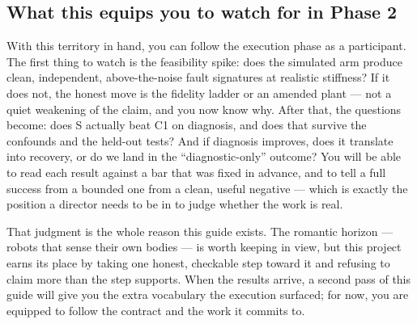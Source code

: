 \documentclass[12pt]{article}
\begin{document}
\subsection{What this equips you to watch for in Phase 2}

With this territory in hand, you can follow the execution phase as a participant. The first thing to watch is the feasibility spike: does the simulated arm produce clean, independent, above-the-noise fault signatures at realistic stiffness? If it does not, the honest move is the fidelity ladder or an amended plant --- not a quiet weakening of the claim, and you now know why. After that, the questions become: does S actually beat C1 on diagnosis, and does that survive the confounds and the held-out tests? And if diagnosis improves, does it translate into recovery, or do we land in the ``diagnostic-only'' outcome? You will be able to read each result against a bar that was fixed in advance, and to tell a full success from a bounded one from a clean, useful negative --- which is exactly the position a director needs to be in to judge whether the work is real.

That judgment is the whole reason this guide exists. The romantic horizon --- robots that sense their own bodies --- is worth keeping in view, but this project earns its place by taking one honest, checkable step toward it and refusing to claim more than the step supports. When the results arrive, a second pass of this guide will give you the extra vocabulary the execution surfaced; for now, you are equipped to follow the contract and the work it commits to.
\end{document}
